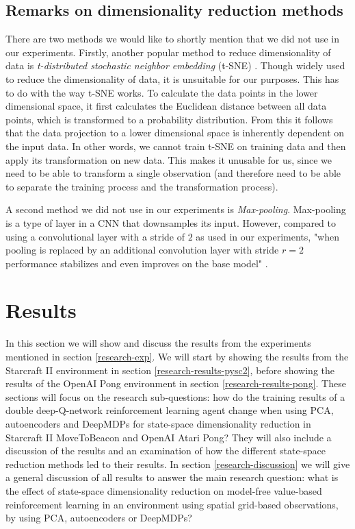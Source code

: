 \subsection{Remarks on dimensionality reduction methods}
There are two methods we would like to shortly mention that we did not use in our experiments. Firstly, another popular method to reduce dimensionality of data is \emph{t-distributed stochastic neighbor embedding} (t-SNE) \cite{tsne}. Though widely used to reduce the dimensionality of data, it is unsuitable for our purposes. This has to do with the way t-SNE works. To calculate the data points in the lower dimensional space, it first calculates the Euclidean distance between all data points, which is transformed to a probability distribution. From this it follows that the data projection to a lower dimensional space is inherently dependent on the input data. In other words, we cannot train t-SNE on training data and then apply its transformation on new data. This makes it unusable for us, since we need to be able to transform a single observation (and therefore need to be able to separate the training process and the transformation process). 

A second method we did not use in our experiments is \emph{Max-pooling}. Max-pooling is a type of layer in a CNN that downsamples its input. However, compared to using a convolutional layer with a stride of $2$ as used in our experiments, "when pooling is replaced by an additional convolution layer with stride $r = 2$ performance stabilizes and even improves on the base model" \cite{maxvsconv}.
 

\section{Results}\label{research-results}
In this section we will show and discuss the results from the experiments mentioned in section \ref{research-exp}. We will start by showing the results from the Starcraft II environment in section \ref{research-results-pysc2}, before showing the results of the OpenAI Pong environment in section \ref{research-results-pong}. These sections will focus on the research sub-questions: how do the training results of a double deep-Q-network reinforcement learning agent change when using PCA, autoencoders and DeepMDPs for state-space dimensionality reduction in Starcraft II MoveToBeacon and OpenAI Atari Pong? They will also include a discussion of the results and an examination of how the different state-space reduction methods led to their results. In section \ref{research-discussion} we will give a general discussion of all results to answer the main research question: what is the effect of state-space dimensionality reduction on model-free value-based reinforcement learning in an environment using spatial grid-based observations, by using PCA, autoencoders or DeepMDPs?

